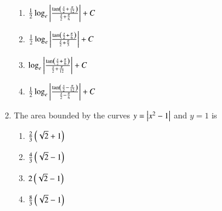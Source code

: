 \documentclass[journal,12pt,onecolumn]{IEEEtran}
\theoremstyle{remark}
\begin{document}
\begin{enumerate}
\begin{enumerate}
        \item $\frac{1}{2}\log_e\left\vert\frac{\tan\left(\frac{x}{2}+\frac{\pi}{12}\right)}{\frac{x}{2}+\frac{\pi}{6}}\right\vert + C $
        \item $\frac{1}{2}\log_e\left\vert\frac{\tan\left(\frac{x}{2}+\frac{\pi}{6}\right)}{\frac{x}{2}+\frac{\pi}{3}}\right\vert + C $
        \item $\log_e\left\vert\frac{\tan\left(\frac{x}{2}+\frac{\pi}{6}\right)}{\frac{x}{2}+\frac{\pi}{12}}\right\vert + C $
        \item $\frac{1}{2}\log_e\left\vert\frac{\tan\left(\frac{x}{2}-\frac{\pi}{12}\right)}{\frac{x}{2}-\frac{\pi}{6}}\right\vert + C $
    \end{enumerate}
    \item The area bounded by the curves $y=\left\vert x^2-1\right\vert$ and $y=1$ is 
    \begin{enumerate}
        \item $\frac{2}{3}\left(\sqrt{2}+1\right)$
        \item $\frac{4}{3}\left(\sqrt{2}-1\right)$
        \item $2\left(\sqrt{2}-1\right)$
        \item $\frac{8}{3}\left(\sqrt{2}-1\right)$
    \end{enumerate}
    \end{enumerate}
\end{document}
